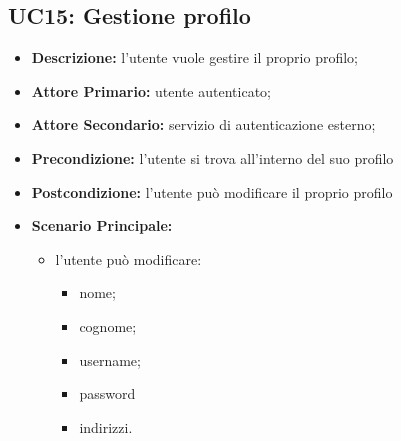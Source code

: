 \subsection{UC15: Gestione profilo}
\label{sec:UC15}
\begin{itemize}
    \item \textbf{Descrizione:} l'utente vuole gestire il proprio profilo;
    \item \textbf{Attore Primario:} utente autenticato;
    \item \textbf{Attore Secondario:} servizio di autenticazione esterno;
    \item \textbf{Precondizione:} l'utente si trova all'interno del suo profilo
    \item \textbf{Postcondizione:} l'utente può modificare il proprio profilo
    \item \textbf{Scenario Principale:}
    \begin{itemize}
        \item  l'utente può modificare:
        \begin{itemize}
            \item nome;
            \item cognome;
            \item username;
            \item password
            \item indirizzi.
        \end{itemize}
    \end{itemize}
\end{itemize}